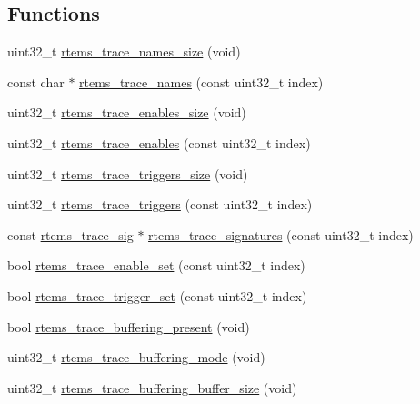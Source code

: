 \subsection*{Functions}
\begin{DoxyCompactItemize}
\item 
uint32\+\_\+t \mbox{\hyperlink{rtems-trace-buffer-vars_8h_aa2dd8e0347a010456efd79832db2cb6d}{rtems\+\_\+trace\+\_\+names\+\_\+size}} (void)
\item 
const char $\ast$ \mbox{\hyperlink{rtems-trace-buffer-vars_8h_a055be1423db6d10f57bea41e72edb8fc}{rtems\+\_\+trace\+\_\+names}} (const uint32\+\_\+t index)
\item 
uint32\+\_\+t \mbox{\hyperlink{rtems-trace-buffer-vars_8h_a6ba088660a330ac4f4e6e1bec0f4ed36}{rtems\+\_\+trace\+\_\+enables\+\_\+size}} (void)
\item 
uint32\+\_\+t \mbox{\hyperlink{rtems-trace-buffer-vars_8h_a425efbc22960d9e064acee2ad4a1f251}{rtems\+\_\+trace\+\_\+enables}} (const uint32\+\_\+t index)
\item 
uint32\+\_\+t \mbox{\hyperlink{rtems-trace-buffer-vars_8h_ae0f205d7d7f5021bf32c3eb7a9e62560}{rtems\+\_\+trace\+\_\+triggers\+\_\+size}} (void)
\item 
uint32\+\_\+t \mbox{\hyperlink{rtems-trace-buffer-vars_8h_a7b1bdbe3472f3d0c49f7c9ce5edfba27}{rtems\+\_\+trace\+\_\+triggers}} (const uint32\+\_\+t index)
\item 
const \mbox{\hyperlink{struct____rtld__trace__sig}{rtems\+\_\+trace\+\_\+sig}} $\ast$ \mbox{\hyperlink{rtems-trace-buffer-vars_8h_a80a922032aeaf04d50259119f1447e75}{rtems\+\_\+trace\+\_\+signatures}} (const uint32\+\_\+t index)
\item 
bool \mbox{\hyperlink{rtems-trace-buffer-vars_8h_a65eff2f599c5beeac520a30e4b250df5}{rtems\+\_\+trace\+\_\+enable\+\_\+set}} (const uint32\+\_\+t index)
\item 
bool \mbox{\hyperlink{rtems-trace-buffer-vars_8h_aa0bf641d833de8c8590d99db7b590649}{rtems\+\_\+trace\+\_\+trigger\+\_\+set}} (const uint32\+\_\+t index)
\item 
bool \mbox{\hyperlink{rtems-trace-buffer-vars_8h_a0bff82b835c83c6cc5d4ab4e9af5c2fd}{rtems\+\_\+trace\+\_\+buffering\+\_\+present}} (void)
\item 
uint32\+\_\+t \mbox{\hyperlink{rtems-trace-buffer-vars_8h_a0e668f3e3a4d2f085b376efac65216d6}{rtems\+\_\+trace\+\_\+buffering\+\_\+mode}} (void)
\item 
uint32\+\_\+t \mbox{\hyperlink{rtems-trace-buffer-vars_8h_ab58d7a8a9793579b0310fd19ff23ce9a}{rtems\+\_\+trace\+\_\+buffering\+\_\+buffer\+\_\+size}} (void)

\end{DoxyCompactItemize}
